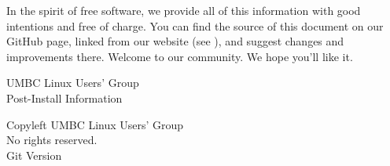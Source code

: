 \documentclass[11pt,notumble]{leaflet}
\begin{document}
In the spirit of free software, we provide all of this information with good
intentions and free of charge. You can find the source of this document on our
GitHub page, linked from our website (see ), and
suggest changes and improvements there. Welcome to our community. We hope you'll
like it.

\pagebreak

\begin{center} \Large
    UMBC Linux Users' Group \\
    Post-Install Information
\end{center}

\vfill
\begin{center} \small 
    \textcopyleft{} Copyleft \the\year{} UMBC Linux Users' Group \\
    No rights reserved. \\
    Git Version 
\end{center}
\end{document}

